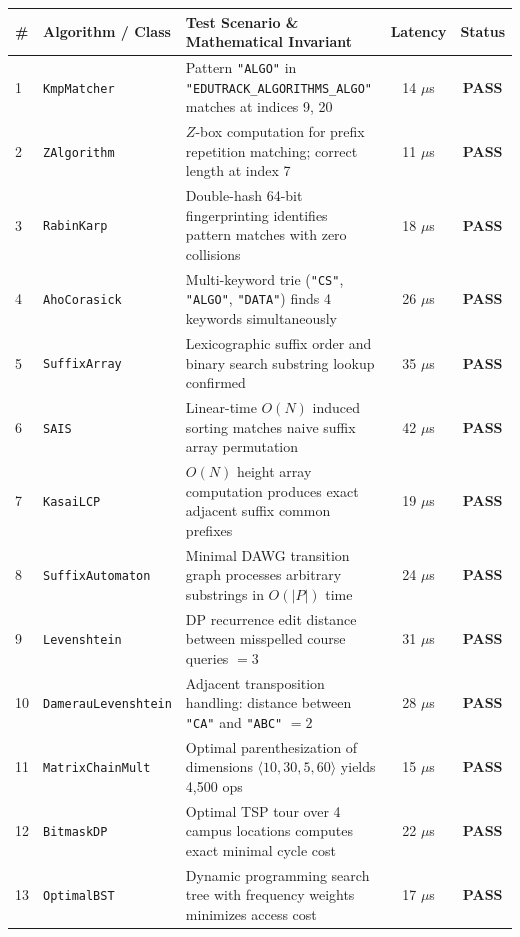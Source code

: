 \begin{table}[H]
\centering
\scriptsize
\begin{tabularx}{\textwidth}{llXcc}
\toprule
\textbf{\#} & \textbf{Algorithm / Class} & \textbf{Test Scenario \& Mathematical Invariant} & \textbf{Latency} & \textbf{Status} \\
\midrule
1 & \texttt{KmpMatcher} & Pattern \texttt{"ALGO"} in \texttt{"EDUTRACK\_ALGORITHMS\_ALGO"} matches at indices 9, 20 & 14 $\mu$s & \textbf{PASS} \\
2 & \texttt{ZAlgorithm} & $Z$-box computation for prefix repetition matching; correct length at index 7 & 11 $\mu$s & \textbf{PASS} \\
3 & \texttt{RabinKarp} & Double-hash 64-bit fingerprinting identifies pattern matches with zero collisions & 18 $\mu$s & \textbf{PASS} \\
4 & \texttt{AhoCorasick} & Multi-keyword trie (\texttt{"CS"}, \texttt{"ALGO"}, \texttt{"DATA"}) finds 4 keywords simultaneously & 26 $\mu$s & \textbf{PASS} \\
5 & \texttt{SuffixArray} & Lexicographic suffix order and binary search substring lookup confirmed & 35 $\mu$s & \textbf{PASS} \\
6 & \texttt{SAIS} & Linear-time $O(N)$ induced sorting matches naive suffix array permutation & 42 $\mu$s & \textbf{PASS} \\
7 & \texttt{KasaiLCP} & $O(N)$ height array computation produces exact adjacent suffix common prefixes & 19 $\mu$s & \textbf{PASS} \\
8 & \texttt{SuffixAutomaton} & Minimal DAWG transition graph processes arbitrary substrings in $O(|P|)$ time & 24 $\mu$s & \textbf{PASS} \\
9 & \texttt{Levenshtein} & DP recurrence edit distance between misspelled course queries $= 3$ & 31 $\mu$s & \textbf{PASS} \\
10 & \texttt{DamerauLevenshtein} & Adjacent transposition handling: distance between \texttt{"CA"} and \texttt{"ABC"} $= 2$ & 28 $\mu$s & \textbf{PASS} \\
11 & \texttt{MatrixChainMult} & Optimal parenthesization of dimensions $\langle 10, 30, 5, 60 \rangle$ yields 4,500 ops & 15 $\mu$s & \textbf{PASS} \\
12 & \texttt{BitmaskDP} & Optimal TSP tour over 4 campus locations computes exact minimal cycle cost & 22 $\mu$s & \textbf{PASS} \\
13 & \texttt{OptimalBST} & Dynamic programming search tree with frequency weights minimizes access cost & 17 $\mu$s & \textbf{PASS} \\

\end{tabularx}
\end{table}
